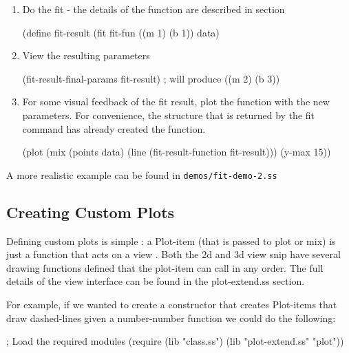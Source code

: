 \documentclass{article}
\begin{document}
{\begin{enumerate}
\item Do the fit - the details of the function are described in  section
\begin{schemedisplay}

(define fit-result 
  (fit 
   fit-fun 
   ((m 1) (b 1)) 
   data)
\end{schemedisplay}

\item View the resulting parameters
\begin{schemedisplay}

(fit-result-final-params fit-result) ; will produce ((m 2) (b 3))         
         
\end{schemedisplay}

\item For some visual feedback of the fit result, plot the function 
         with the new parameters. For convenience, the structure that is returned
         by the fit command has already created the function.
\begin{schemedisplay}

(plot (mix 
        (points data)
        (line (fit-result-function fit-result)))
      (y-max 15))
\end{schemedisplay}

\end{enumerate}

A more realistic example can be found in {\tt demos/fit-demo-2.ss}

\subsection{Creating Custom Plots}


Defining custom plots is simple : a Plot-item (that is passed to plot or mix) is just a function
       that acts on a  {view }. Both the 2d and 3d view snip have several drawing
functions defined that
the plot-item can call in any order. The full details of the view interface can be found in the
 {plot-extend.ss} section. 


For example, if we wanted to create a constructor that creates Plot-items that 
       draw dashed-lines given a number-number function we could do the following:
\begin{schemedisplay}
; Load the required modules
(require (lib "class.ss")
         (lib "plot-extend.ss" "plot"))



\end{schemedisplay}}
\end{document}
